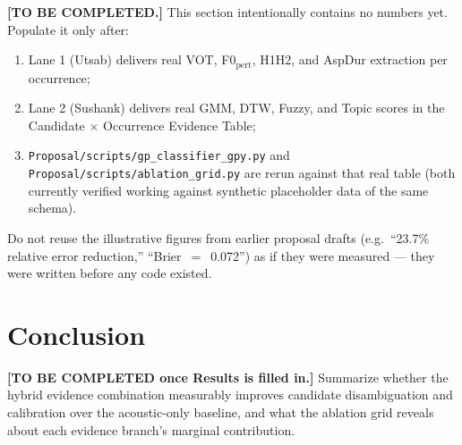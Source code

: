 \documentclass[10pt,conference]{IEEEtran}
\begin{document}
\textbf{[TO BE COMPLETED.]} This section intentionally contains no
numbers yet. Populate it only after:
\begin{enumerate}
  \item Lane 1 (Utsab) delivers real VOT, F0$_{\text{pert}}$, H1H2, and
        AspDur extraction per occurrence;
  \item Lane 2 (Sushank) delivers real GMM, DTW, Fuzzy, and Topic scores
        in the Candidate $\times$ Occurrence Evidence Table;
  \item \texttt{Proposal/scripts/gp\_classifier\_gpy.py} and
        \texttt{Proposal/scripts/ablation\_grid.py} are rerun against
        that real table (both currently verified working against
        synthetic placeholder data of the same schema).
\end{enumerate}
Do not reuse the illustrative figures from earlier proposal drafts
(e.g.\ ``23.7\% relative error reduction,'' ``Brier~$=$~0.072'') as if
they were measured --- they were written before any code existed.

\section{Conclusion}

\textbf{[TO BE COMPLETED once Results is filled in.]} Summarize whether
the hybrid evidence combination measurably improves candidate
disambiguation and calibration over the acoustic-only baseline, and what
the ablation grid reveals about each evidence branch's marginal
contribution.
\end{document}
